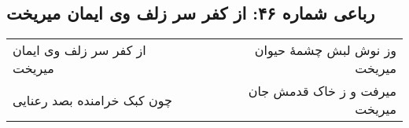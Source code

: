 \begin{center}
\section*{رباعی شماره ۴۶: از کفر سر زلف وی ایمان میریخت}
\label{sec:sh046}
\begin{longtable}{l p{0.5cm} r}
از کفر سر زلف وی ایمان میریخت
&&
وز نوش لبش چشمهٔ حیوان میریخت
\\
چون کبک خرامنده بصد رعنایی
&&
میرفت و ز خاک قدمش جان میریخت
\\
\end{longtable}
\end{center}
